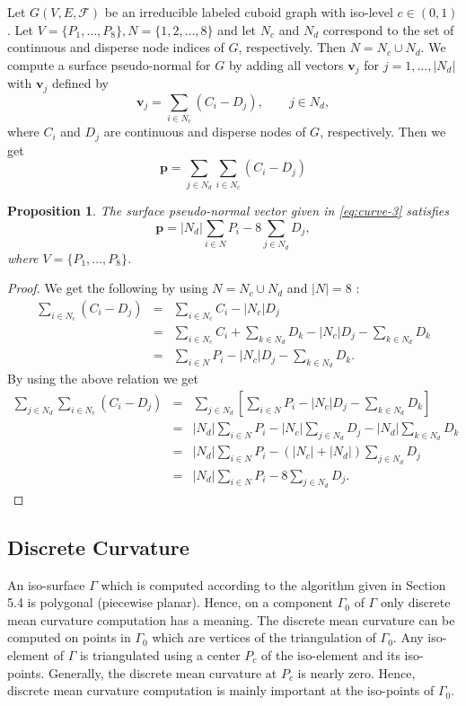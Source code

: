 \documentclass[a4paper,11pt]{article}
\newtheorem{proposition}[theorem]{Proposition}
\begin{document}
Let $G(V,E,\mathcal{F})$ be an irreducible labeled cuboid graph
with iso-level $c\in (0,1)$. Let $V=\{P_1,\ldots,P_8\}, N=\{1,2,\ldots,8\}$ and let $N_c$ and $N_d$
correspond to the set of continuous and disperse node indices of $G$, respectively.
Then $N=N_c\cup N_d$. We compute a surface pseudo-normal for $G$ by adding all vectors
$\pmb{v}_j$ for $j = 1,\ldots,|N_d|$ with $\pmb{v}_j$ defined by
\begin{equation}
\pmb{v}_j=\sum_{i\in N_c}(C_i-D_j), \qquad  j\in N_d,
\label{eq:curve-2}
\end{equation}
where $C_i$ and $D_j$ are continuous and disperse nodes of $G$, respectively.
Then we get
\begin{equation}
\pmb{p}=\sum_{j\in N_d}\sum_{i\in N_c}(C_i-D_j)
\label{eq:curve-3}
\end{equation}
\begin{proposition}The surface pseudo-normal vector given in \eqref{eq:curve-3} satisfies
\begin{equation*}
\pmb{p}=|N_d|\sum_{i\in N}P_i-8\sum_{j\in N_d}D_j,
\end{equation*}
where $V=\{P_1,\ldots,P_8\}$.
\label{prop:curve-2}
\end{proposition}
\begin{proof}
We get the following by using $N=N_c\cup N_d$ and $|N|=8$ :
\begin{eqnarray*}
\sum_{i\in N_c}(C_i-D_j)&=&\sum_{i\in N_c}C_i-|N_c|D_j\\
&=&\sum_{i\in N_c}C_i+\sum_{k\in N_d}D_k-|N_c|D_j-\sum_{k\in N_d}D_k\\
&=&\sum_{i\in N}P_i-|N_c|D_j-\sum_{k\in N_d}D_k.
\end{eqnarray*}
By using the above relation we get
\begin{eqnarray*}
\sum_{j\in N_d}\sum_{i\in N_c}(C_i-D_j)&=&\sum_{j\in N_d}
\left[\sum_{i\in N}P_i-|N_c|D_j-\sum_{k\in N_d}D_k\right]\\
&=&|N_d|\sum_{i\in N}P_i-|N_c|\sum_{j\in N_d}D_j-|N_d|\sum_{k\in N_d}D_k\\
&=&|N_d|\sum_{i\in N}P_i-(|N_c|+|N_d|)\sum_{j\in N_d}D_j\\
&=&|N_d|\sum_{i\in N}P_i-8\sum_{j\in N_d}D_j.
\end{eqnarray*}
\end{proof}

\subsection{Discrete Curvature}
An iso-surface $\Gamma$ which is computed according to the algorithm given in Section 5.4 is polygonal
(piecewise planar). Hence, on a component $\Gamma_0$ of $\Gamma$ only discrete mean curvature computation
has a meaning. The discrete mean curvature can be computed on points in $\Gamma_0$ which are vertices of the
triangulation of $\Gamma_0$. Any iso-element of $\Gamma$ is triangulated using a center $P_c$
of the iso-element and its iso-points. Generally, the discrete mean curvature at $P_c$ is nearly zero. Hence,
discrete mean curvature computation is mainly important at the iso-points of $\Gamma_0$.
\end{document}
